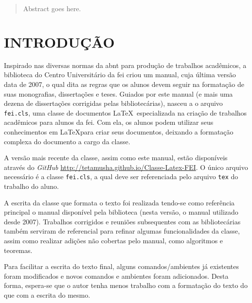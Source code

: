 \documentclass[xindy,rascunho]{fei}
\begin{document}
\begin{abstract}
Abstract goes here.
\end{abstract}

\figuras
\tabelas
\algoritmos
\teoremas
\printglossaries
\sumario

\chapter{INTRODUÇÃO}

Inspirado nas diversas normas da \gls{abnt} para produção de trabalhos acadêmicos, a biblioteca do Centro Universitário da \gls{fei} criou um manual, cuja última versão data de 2007, o qual dita as regras que os alunos devem seguir na formatação de suas monografias, dissertações e teses. Guiados por este manual (e mais uma dezena de dissertações corrigidas pelas bibliotecárias), nasceu a o arquivo \texttt{fei.cls}, uma classe de documentos \LaTeX\ especializada na criação de trabalhos acadêmicos para alunos da \gls{fei}. Com ela, os alunos podem utilizar seus conhecimentos em \LaTeX para criar seus documentos, deixando a formatação complexa do documento a cargo da classe.

A versão mais recente da classe, assim como este manual, estão disponíveis através do \emph{GitHub} \url{http://tetamusha.github.io/Classe-Latex-FEI}. O único arquivo necessário é a classe \texttt{fei.cls}, a qual deve ser referenciada pelo arquivo \texttt{tex} do trabalho do aluno.

A escrita da classe que formata o texto foi realizada tendo-se como referência principal o manual disponível pela biblioteca (nesta versão, o manual utilizado desde 2007). Trabalhos corrigidos e reuniões subsequentes com as bibliotecárias também serviram de referencial para refinar algumas funcionalidades da classe, assim como realizar adições não cobertas pelo manual, como algoritmos e teoremas.

Para facilitar a escrita do texto final, alguns comandos/ambientes já existentes foram modificados e novos comandos e ambientes foram adicionados. Desta forma, espera-se que o autor tenha menos trabalho com a formatação do texto do que com a escrita do mesmo.
\end{document}
